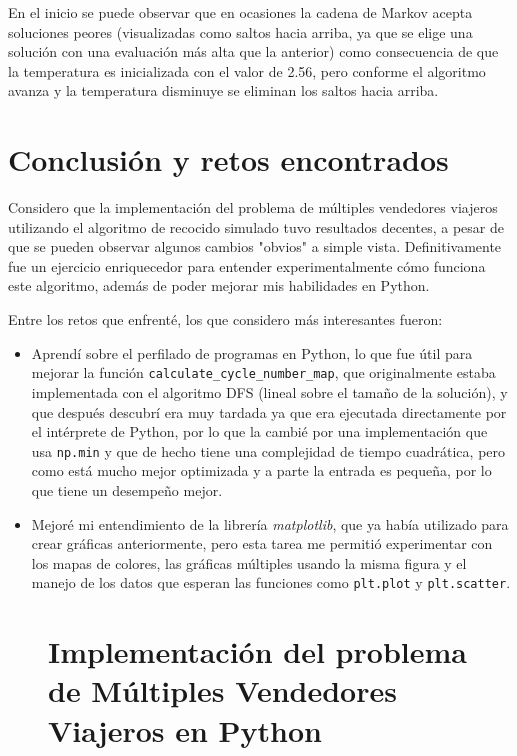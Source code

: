\documentclass[sigconf,authorversion,nonacm]{acmart}
\begin{document}
En el inicio se puede observar que en ocasiones la cadena de Markov acepta soluciones peores (visualizadas como saltos hacia arriba, ya que se elige una solución con una evaluación más alta que la anterior) como consecuencia de que la temperatura es inicializada con el valor de 2.56, pero conforme el algoritmo avanza y la temperatura disminuye se eliminan los saltos hacia arriba.

\section{Conclusión y retos encontrados}
Considero que la implementación del problema de múltiples vendedores viajeros utilizando el algoritmo de recocido simulado tuvo resultados decentes, a pesar de que se pueden observar algunos cambios "obvios" a simple vista. Definitivamente fue un ejercicio enriquecedor para entender experimentalmente cómo funciona este algoritmo, además de poder mejorar mis habilidades en Python.

Entre los retos que enfrenté, los que considero más interesantes fueron:
\begin{itemize}
  \item Aprendí sobre el perfilado de programas en Python, lo que fue útil para mejorar la función \texttt{calculate\_cycle\_number\_map}, que originalmente estaba implementada con el algoritmo DFS (lineal sobre el tamaño de la solución), y que después descubrí era muy tardada ya que era ejecutada directamente por el intérprete de Python, por lo que la cambié por una implementación que usa \texttt{np.min} y que de hecho tiene una complejidad de tiempo cuadrática, pero como está mucho mejor optimizada y a parte la entrada es pequeña, por lo que tiene un desempeño mejor.
  \item Mejoré mi entendimiento de la librería \textit{matplotlib}, que ya había utilizado para crear gráficas anteriormente, pero esta tarea me permitió experimentar con los mapas de colores, las gráficas múltiples usando la misma figura y el manejo de los datos que esperan las funciones como \texttt{plt.plot} y \texttt{plt.scatter}.
\end{itemize}





\clearpage

\appendix

\begin{figure}
  \section{Implementación del problema de Múltiples Vendedores Viajeros en Python}
  \inputminted[lastline=50]{python}{/home/mario/git/MarioJim/ITC-Tec/Sem7/InteligenciaComp/RecocidoSimulado/A01173359_T2.py}
\end{figure}
\end{document}
